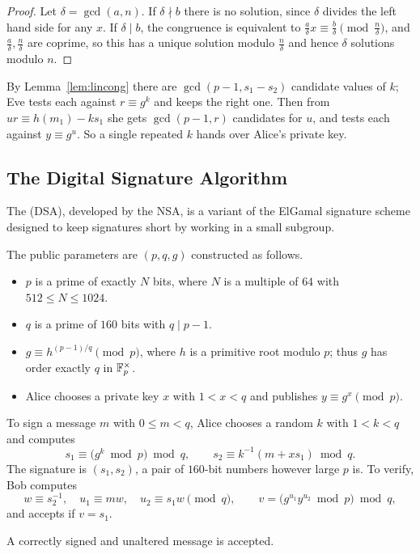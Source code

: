 \documentclass[a4paper]{scrartcl}
\begin{document}
\begin{proof}
	Let $\delta = \gcd(a,n)$. If $\delta\nmid b$ there is no solution, since $\delta$ divides the left hand side for any $x$. If $\delta\mid b$, the congruence is equivalent to $\frac a\delta x\equiv\frac b\delta \pmod{\frac n\delta}$, and $\frac a\delta, \frac n\delta$ are coprime, so this has a unique solution modulo $\frac n\delta$ and hence $\delta$ solutions modulo $n$.
\end{proof}

By Lemma~\ref{lem:lincong} there are $\gcd(p-1,s_1-s_2)$ candidate values of $k$; Eve tests each against $r\equiv g^k$ and keeps the right one. Then from $ur\equiv h(m_1)-ks_1$ she gets $\gcd(p-1,r)$ candidates for $u$, and tests each against $y \equiv g^u$. So a single repeated $k$ hands over Alice's private key.

\subsection{The Digital Signature Algorithm}

The  (DSA), developed by the NSA, is a variant of the ElGamal signature scheme designed to keep signatures short by working in a small subgroup.

The public parameters are $(p,q,g)$ constructed as follows.
\begin{itemize}
	\item $p$ is a prime of exactly $N$ bits, where $N$ is a multiple of $64$ with $512\le N\le1024$.
	\item $q$ is a prime of $160$ bits with $q \mid p-1$.
	\item $g \equiv h^{(p-1)/q}\pmod p$, where $h$ is a primitive root modulo $p$; thus $g$ has order exactly $q$ in $\mathbb{F}_p^\times$.
	\item Alice chooses a private key $x$ with $1<x<q$ and publishes $y \equiv g^x \pmod p$.
\end{itemize}

To sign a message $m$ with $0 \le m<q$, Alice chooses a random $k$ with $1<k<q$ and computes
$$s_1 \equiv \bigl(g^k \bmod p\bigr)\bmod q, \qquad s_2 \equiv k^{-1}(m+xs_1)\bmod q.$$
The signature is $(s_1,s_2)$, a pair of $160$-bit numbers however large $p$ is. To verify, Bob computes
$$w \equiv s_2^{-1}, \quad u_1 \equiv mw, \quad u_2\equiv s_1w \pmod q, \qquad v = \bigl(g^{u_1}y^{u_2}\bmod p\bigr)\bmod q,$$
and accepts if $v = s_1$.

\begin{proposition}
	A correctly signed and unaltered message is accepted.
\end{proposition}
\end{document}
